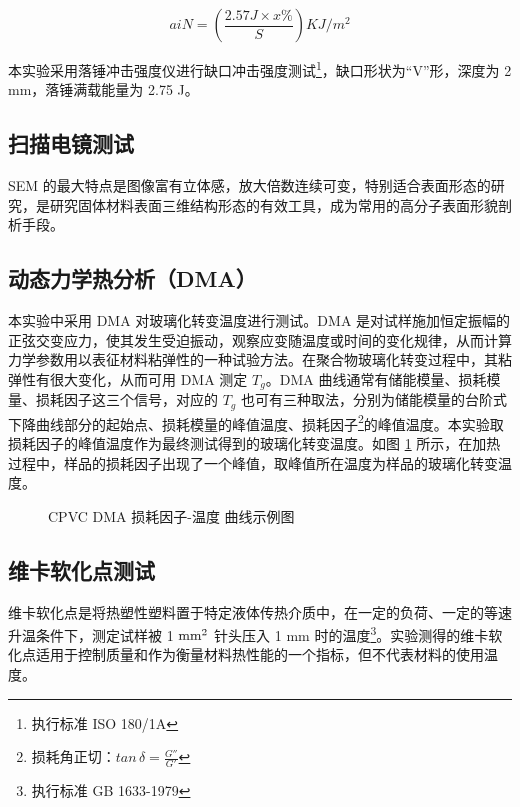 \begin{equation}
    \label{eqImpactS}
    aiN = (\frac{2.57 J \times x\%}{S}) KJ/m^2
\end{equation}

本实验采用落锤冲击强度仪进行缺口冲击强度测试\footnote{执行标准 ISO 180/1A}，缺口形状为“V”形，深度为 2 mm，落锤满载能量为 2.75 J。

\subsection{扫描电镜测试}
SEM 的最大特点是图像富有立体感，放大倍数连续可变，特别适合表面形态的研究，是研究固体材料表面三维结构形态的有效工具，成为常用的高分子表面形貌剖析手段。

\subsection{动态力学热分析（DMA）}
本实验中采用 DMA 对玻璃化转变温度进行测试。DMA 是对试样施加恒定振幅的正弦交变应力，使其发生受迫振动，观察应变随温度或时间的变化规律，从而计算力学参数用以表征材料粘弹性的一种试验方法。在聚合物玻璃化转变过程中，其粘弹性有很大变化，从而可用 DMA 测定 $T_g$。DMA 曲线通常有储能模量、损耗模量、损耗因子这三个信号，对应的 $T_g$ 也可有三种取法，分别为储能模量的台阶式下降曲线部分的起始点、损耗模量的峰值温度、损耗因子\footnote{损耗角正切：$tan \, \delta = \frac{G''}{G'}$}的峰值温度。本实验取损耗因子的峰值温度作为最终测试得到的玻璃化转变温度。如图 \ref{figExTg} 所示，在加热过程中，样品的损耗因子出现了一个峰值，取峰值所在温度为样品的玻璃化转变温度。

\begin{figure}[!htb]
    \begin{center}
        
    \end{center}
    \caption{CPVC DMA 损耗因子-温度 曲线示例图}
    \label{figExTg}
\end{figure}

\subsection{维卡软化点测试}
维卡软化点是将热塑性塑料置于特定液体传热介质中，在一定的负荷、一定的等速升温条件下，测定试样被 1 $\rm{mm^2}$ 针头压入 1 mm 时的温度\footnote{执行标准 GB 1633-1979}。实验测得的维卡软化点适用于控制质量和作为衡量材料热性能的一个指标，但不代表材料的使用温度。
